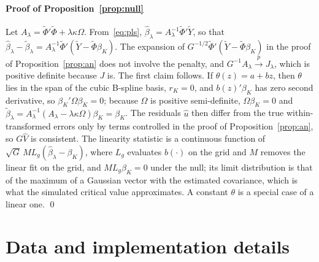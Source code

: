 \documentclass[preprint,12pt,authoryear]{elsarticle}
\begin{document}
\paragraph{Proof of Proposition~\ref{prop:null}}
Let $A_\lambda=\tilde\Phi'\tilde\Phi+\lambda\kappa\Omega$. From~\eqref{eq:pls}, $\hat\beta_\lambda=A_\lambda^{-1}\tilde\Phi'\tilde Y$, so that $\hat\beta_\lambda-\tilde\beta_\lambda=A_\lambda^{-1}\tilde\Phi'(\tilde Y-\tilde\Phi\beta_K)$. The expansion of $G^{-1/2}\tilde\Phi'(\tilde Y-\tilde\Phi\beta_K)$ in the proof of Proposition~\ref{prop:an} does not involve the penalty, and $G^{-1}A_\lambda\xrightarrow{p}J_\lambda$, which is positive definite because $J$ is. The first claim follows. If $\theta(z)=a+bz$, then $\theta$ lies in the span of the cubic B-spline basis, $r_K=0$, and $b(z)'\beta_K$ has zero second derivative, so $\beta_K'\Omega\beta_K=0$; because $\Omega$ is positive semi-definite, $\Omega\beta_K=0$ and $\tilde\beta_\lambda=A_\lambda^{-1}(A_\lambda-\lambda\kappa\Omega)\beta_K=\beta_K$. The residuals $\hat u$ then differ from the true within-transformed errors only by terms controlled in the proof of Proposition~\ref{prop:an}, so $G\hat V$ is consistent. The linearity statistic is a continuous function of $\sqrt G\,ML_g(\hat\beta_\lambda-\beta_K)$, where $L_g$ evaluates $b(\cdot)$ on the grid and $M$ removes the linear fit on the grid, and $ML_g\beta_K=0$ under the null; its limit distribution is that of the maximum of a Gaussian vector with the estimated covariance, which is what the simulated critical value approximates. A constant $\theta$ is a special case of a linear one. \qed

\section{Data and implementation details}\label{app:data}
\end{document}
